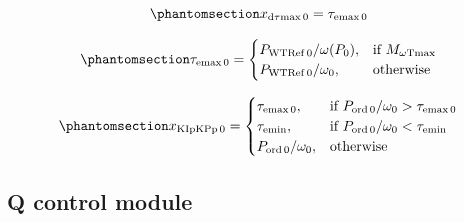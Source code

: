 \documentclass[
  a4paper,
  DIV=11,
  numbers=noendperiod]{scrartcl}
\begin{document}
\begin{equation}\phantomsection\label{eq-initDTauMax}{
x_\mathrm{d\tau max\,0} = \tau_\mathrm{emax\,0}
}\end{equation}

\begin{equation}\phantomsection\label{eq-initTauEMax}{
\tau_\mathrm{emax\,0} = 
\begin{cases}
    P_\mathrm{WTRef\,0} / \mathbf{\omega}(P_\mathrm{0}),& \text{if } M_\mathrm{\omega T max}\\
    P_\mathrm{WTRef\,0} / \omega_0,              & \mathrm{otherwise}
\end{cases}
}\end{equation}

\begin{equation}\phantomsection\label{eq-initTauEMax}{
x_\mathrm{KIpKPp\,0} = 
\begin{cases}
    \tau_\mathrm{emax\,0},& \text{if } P_\mathrm{ord\,0}/\omega_0 > \tau_\mathrm{emax\,0}\\
    \tau_\mathrm{emin},& \text{if } P_\mathrm{ord\,0}/\omega_0 < \tau_\mathrm{emin}\\
    P_\mathrm{ord\,0}/\omega_0,              & \mathrm{otherwise}
\end{cases}
}\end{equation}

\subsection{Q control module}\label{q-control-module}
\end{document}
